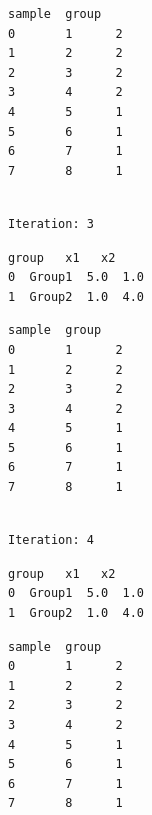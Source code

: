 \documentclass[11pt]{article}
\begin{document}
    
    
    \begin{Verbatim}[commandchars=\\\{\}]
   sample  group
0       1      2
1       2      2
2       3      2
3       4      2
4       5      1
5       6      1
6       7      1
7       8      1
    \end{Verbatim}

    
    \begin{Verbatim}[commandchars=\\\{\}]

Iteration: 3
    \end{Verbatim}

    
    \begin{Verbatim}[commandchars=\\\{\}]
    group   x1   x2
0  Group1  5.0  1.0
1  Group2  1.0  4.0
    \end{Verbatim}

    
    
    \begin{Verbatim}[commandchars=\\\{\}]
   sample  group
0       1      2
1       2      2
2       3      2
3       4      2
4       5      1
5       6      1
6       7      1
7       8      1
    \end{Verbatim}

    
    \begin{Verbatim}[commandchars=\\\{\}]

Iteration: 4
    \end{Verbatim}

    
    \begin{Verbatim}[commandchars=\\\{\}]
    group   x1   x2
0  Group1  5.0  1.0
1  Group2  1.0  4.0
    \end{Verbatim}

    
    
    \begin{Verbatim}[commandchars=\\\{\}]
   sample  group
0       1      2
1       2      2
2       3      2
3       4      2
4       5      1
5       6      1
6       7      1
7       8      1
    \end{Verbatim}

    
    \begin{Verbatim}[commandchars=\\\{\}]

    \end{Verbatim}
\end{document}
